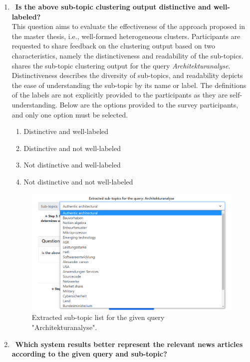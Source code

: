\begin{enumerate}
	\item ~\textbf{Is the above sub-topic clustering output distinctive and well-labeled?} \\
	
This question aims to evaluate the effectiveness of the approach proposed in the master thesis, i.e., well-formed heterogeneous clusters. Participants are requested to share feedback on the clustering output based on two characteristics, namely the distinctiveness and readability of the sub-topics.  shares the sub-topic clustering output for the query \emph{Architekturanalyse}. Distinctiveness describes the diversity of sub-topics, and readability depicts the ease of understanding the sub-topic by its name or label. The definitions of the labels are not explicitly provided to the participants as they are self-understanding. Below are the options provided to the survey participants, and only one option must be selected.

	
	\begin{enumerate}
		\item Distinctive and well-labeled
		\item Distinctive and not well-labeled
		\item Not distinctive and well-labeled
		\item Not distinctive and not well-labeled
	\end{enumerate}
	
	
	\begin{figure}[h]
		\centering
		\includegraphics[width=.8\textwidth]{images/survey/sub-topic-output.png}
		\caption[Sub-topic list example.]{Extracted sub-topic list for the given query "Architekturanalyse". \label{fig:sub_topic_output}}
	\end{figure}
	
	
	\item ~\textbf{Which system results better represent the relevant news articles according to the given query and sub-topic?}  \\
	

\end{enumerate}

